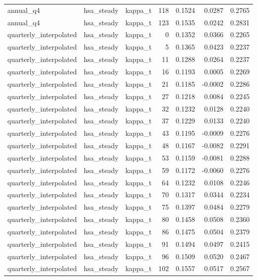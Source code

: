 \begin{tabular}{lllrrrr}
annual\_q4 & hsa\_steady & kappa\_t & 118 & 0.1524 & 0.0287 & 0.2765 \\
annual\_q4 & hsa\_steady & kappa\_t & 123 & 0.1535 & 0.0242 & 0.2831 \\
quarterly\_interpolated & hsa\_steady & kappa\_t & 0 & 0.1352 & 0.0366 & 0.2265 \\
quarterly\_interpolated & hsa\_steady & kappa\_t & 5 & 0.1365 & 0.0423 & 0.2237 \\
quarterly\_interpolated & hsa\_steady & kappa\_t & 11 & 0.1288 & 0.0264 & 0.2237 \\
quarterly\_interpolated & hsa\_steady & kappa\_t & 16 & 0.1193 & 0.0005 & 0.2269 \\
quarterly\_interpolated & hsa\_steady & kappa\_t & 21 & 0.1185 & -0.0002 & 0.2286 \\
quarterly\_interpolated & hsa\_steady & kappa\_t & 27 & 0.1218 & 0.0084 & 0.2245 \\
quarterly\_interpolated & hsa\_steady & kappa\_t & 32 & 0.1232 & 0.0128 & 0.2240 \\
quarterly\_interpolated & hsa\_steady & kappa\_t & 37 & 0.1229 & 0.0133 & 0.2240 \\
quarterly\_interpolated & hsa\_steady & kappa\_t & 43 & 0.1195 & -0.0009 & 0.2276 \\
quarterly\_interpolated & hsa\_steady & kappa\_t & 48 & 0.1167 & -0.0082 & 0.2291 \\
quarterly\_interpolated & hsa\_steady & kappa\_t & 53 & 0.1159 & -0.0081 & 0.2288 \\
quarterly\_interpolated & hsa\_steady & kappa\_t & 59 & 0.1172 & -0.0060 & 0.2276 \\
quarterly\_interpolated & hsa\_steady & kappa\_t & 64 & 0.1232 & 0.0108 & 0.2246 \\
quarterly\_interpolated & hsa\_steady & kappa\_t & 70 & 0.1317 & 0.0344 & 0.2234 \\
quarterly\_interpolated & hsa\_steady & kappa\_t & 75 & 0.1397 & 0.0484 & 0.2279 \\
quarterly\_interpolated & hsa\_steady & kappa\_t & 80 & 0.1458 & 0.0508 & 0.2360 \\
quarterly\_interpolated & hsa\_steady & kappa\_t & 86 & 0.1475 & 0.0504 & 0.2379 \\
quarterly\_interpolated & hsa\_steady & kappa\_t & 91 & 0.1494 & 0.0497 & 0.2415 \\
quarterly\_interpolated & hsa\_steady & kappa\_t & 96 & 0.1509 & 0.0520 & 0.2467 \\
quarterly\_interpolated & hsa\_steady & kappa\_t & 102 & 0.1557 & 0.0517 & 0.2567 \\

\end{tabular}
